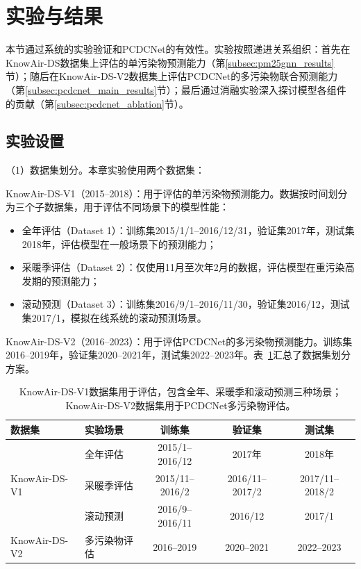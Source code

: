 \section{实验与结果}
\label{sec:pred_experiment}

本节通过系统的实验验证\ModelPred{}和PCDCNet的有效性。实验按照递进关系组织：首先在KnowAir-DS数据集上评估\ModelPred{}的\PM 单污染物预测能力（第\ref{subsec:pm25gnn_results}节）；随后在KnowAir-DS-V2数据集上评估PCDCNet的多污染物联合预测能力（第\ref{subsec:pcdcnet_main_results}节）；最后通过消融实验深入探讨模型各组件的贡献（第\ref{subsec:pcdcnet_ablation}节）。


\subsection{实验设置}
\label{subsec:exp_setup}

（1）数据集划分。本章实验使用两个数据集：

KnowAir-DS-V1（2015--2018）：用于评估\ModelPred{}的\PM 单污染物预测能力。数据按时间划分为三个子数据集，用于评估不同场景下的模型性能：

\begin{itemize}
    \item 全年评估（Dataset 1）：训练集2015/1/1--2016/12/31，验证集2017年，测试集2018年，评估模型在一般场景下的预测能力；
    \item 采暖季评估（Dataset 2）：仅使用11月至次年2月的数据，评估模型在重污染高发期的预测能力；
    \item 滚动预测（Dataset 3）：训练集2016/9/1--2016/11/30，验证集2016/12，测试集2017/1，模拟在线系统的滚动预测场景。
\end{itemize}

KnowAir-DS-V2（2016--2023）：用于评估PCDCNet的多污染物预测能力。训练集2016--2019年，验证集2020--2021年，测试集2022--2023年。表~\ref{tab:pm25gnn_dataset_split}汇总了数据集划分方案。

\begin{table}[htbp]
    \centering
    \caption{数据集划分方案}
    \caption*{KnowAir-DS-V1数据集用于\ModelPred{}评估，包含全年、采暖季和滚动预测三种场景；KnowAir-DS-V2数据集用于PCDCNet多污染物评估。}
    \label{tab:pm25gnn_dataset_split}
    \begin{tabular}{@{}llccc@{}}
        \toprule
        \textbf{数据集} & \textbf{实验场景} & \textbf{训练集} & \textbf{验证集} & \textbf{测试集} \\
        \midrule
        \multirow{3}{*}{KnowAir-DS-V1} & 全年评估 & 2015/1--2016/12 & 2017年 & 2018年 \\
        & 采暖季评估 & 2015/11--2016/2 & 2016/11--2017/2 & 2017/11--2018/2 \\
        & 滚动预测 & 2016/9--2016/11 & 2016/12 & 2017/1 \\
        \midrule
        KnowAir-DS-V2 & 多污染物评估 & 2016--2019 & 2020--2021 & 2022--2023 \\
        \bottomrule
    \end{tabular}
\end{table}


